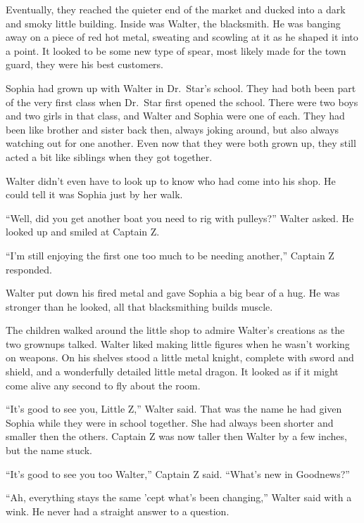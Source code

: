\documentclass[12pt]{extbook}
\begin{document}
  Eventually, they reached the quieter end of the market and ducked into a
  dark and smoky little building. Inside was Walter, the blacksmith. He
  was banging away on a piece of red hot metal, sweating and scowling at
  it as he shaped it into a point. It looked to be some new type of spear,
  most likely made for the town guard, they were his best customers.
  
  Sophia had grown up with Walter in Dr.~Star's school. They had both been
  part of the very first class when Dr.~Star first opened the school.
  There were two boys and two girls in that class, and Walter and Sophia
  were one of each. They had been like brother and sister back then,
  always joking around, but also always watching out for one another. Even
  now that they were both grown up, they still acted a bit like siblings
  when they got together.
  
  Walter didn't even have to look up to know who had come into his shop.
  He could tell it was Sophia just by her walk.
  
  \enquote{Well, did you get another boat you need to rig with pulleys?}
  Walter asked. He looked up and smiled at Captain Z.
  
  \enquote{I'm still enjoying the first one too much to be needing
  another,} Captain Z responded.
  
  Walter put down his fired metal and gave Sophia a big bear of a hug. He
  was stronger than he looked, all that blacksmithing builds muscle.
  
  The children walked around the little shop to admire Walter's creations
  as the two grownups talked. Walter liked making little figures when he
  wasn't working on weapons. On his shelves stood a little metal knight,
  complete with sword and shield, and a wonderfully detailed little metal
  dragon. It looked as if it might come alive any second to fly about the
  room.
  
  \enquote{It's good to see you, Little Z,} Walter said. That was the name
  he had given Sophia while they were in school together. She had always
  been shorter and smaller then the others. Captain Z was now taller then
  Walter by a few inches, but the name stuck.
  
  \enquote{It's good to see you too Walter,} Captain Z said.
  \enquote{What's new in Goodnews?}
  
  \enquote{Ah, everything stays the same 'cept what's been changing,}
  Walter said with a wink. He never had a straight answer to a question.
  
\end{document}
